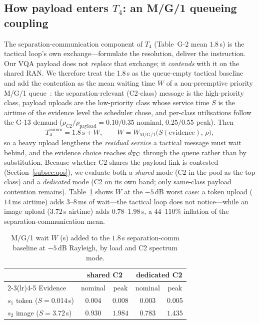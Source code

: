 \subsection{How payload enters $T_4$: an M/G/1 queueing coupling}
\label{subsec:mg1}
The separation-communication component of $T_4$ (Table~G-2 mean $1.8$\,s)
is the tactical loop's own exchange---formulate the resolution, deliver the
instruction. Our VQA payload does not \emph{replace} that exchange; it
\emph{contends} with it on the shared RAN. We therefore treat the $1.8$\,s
as the queue-empty tactical baseline and add the contention as the mean
waiting time $W$ of a non-preemptive priority M/G/1
queue~\cite{kleinrock1975queueing}: the separation-relevant (C2-class)
message is the high-priority class, payload uploads are the low-priority
class whose service time $S$ is the airtime of the evidence level the
scheduler chose, and per-class utilisations follow the G-13 demand
($\rho_{\mathrm{C2}}/\rho_{\mathrm{payload}}=0.10/0.35$ nominal,
$0.25/0.55$ peak). Then
\begin{equation}\label{eq:mg1}
T_4^{\mathrm{comm}} = 1.8\,\mathrm{s} + W,\qquad
W = W_{\mathrm{M/G/1}}\!\big(S(\text{evidence}),\,\rho\big),
\end{equation}
so a heavy upload lengthens the \emph{residual service} a tactical message
must wait behind, and the evidence choice reaches $d_{\mathrm{TC}}$ through the queue
rather than by substitution. Because whether C2 shares the payload link is
contested (Section~\ref{subsec:qos}), we evaluate both a \emph{shared}
mode (C2 in the pool as the top class) and a \emph{dedicated} mode (C2 on
its own band; only same-class payload contention remains).
Table~\ref{tab:wsens} shows $W$ at the $-5$\,dB worst case: a token upload
($14$\,ms airtime) adds $3$--$8$\,ms of wait---the tactical loop does not
notice---while an image upload ($3.72$\,s airtime) adds $0.78$--$1.98$\,s,
a $44$--$110\%$ inflation of the separation-communication mean.

\begin{table}[t]
\centering
\caption{M/G/1 wait $W$ (s) added to the $1.8$\,s separation-comm baseline
at $-5$\,dB Rayleigh, by load and C2 spectrum mode.}
\label{tab:wsens}
\footnotesize
\begin{tabular}{@{}lcccc@{}}
\toprule
 & \multicolumn{2}{c}{shared C2} & \multicolumn{2}{c}{dedicated C2} \\
\cmidrule(lr){2-3}\cmidrule(lr){4-5}
Evidence & nominal & peak & nominal & peak \\
\midrule
$s_1$ token ($S{=}0.014$\,s) & $0.004$ & $0.008$ & $0.003$ & $0.005$ \\
$s_2$ image ($S{=}3.72$\,s)  & $0.930$ & $1.984$ & $0.783$ & $1.435$ \\
\bottomrule
\end{tabular}
\end{table}

